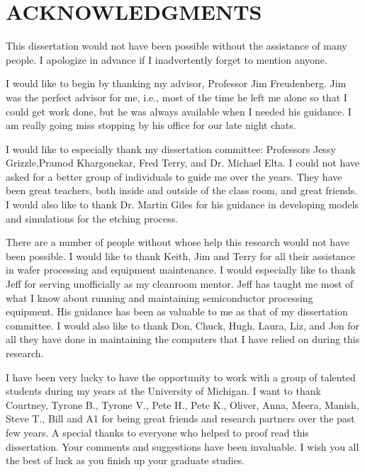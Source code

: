 
\chapter*{ACKNOWLEDGMENTS}


\tab This dissertation would not have been possible without the assistance of many people. I apologize in advance if I inadvertently forget to mention anyone.

I would like to begin by thanking my advisor, Professor Jim Freudenberg. Jim was the perfect advisor for me, i.e., most of the time he left me alone so that I could get work done, but he was always available when I needed his guidance. I am really going miss stopping by his office for our late night chats.

I would like to especially thank my dissertation committee: Professors Jessy Grizzle,Pramod Khargonekar, Fred Terry, and Dr. Michael Elta. I could not have asked for a better group of individuals to guide me over the years. They have been great teachers, both inside and outside of the class room, and great friends. I would also like to thank Dr. Martin Giles for his guidance in developing models and simulations for the etching process.

There are a number of people without whose help this research would not have been possible. I would like to thank Keith, Jim and Terry for all their assistance in wafer processing and equipment maintenance. I would especially like to thank Jeff for serving unofficially as my cleanroom mentor. Jeff has taught me most of what I know about running and maintaining semiconductor processing equipment. His guidance has been as valuable to me as that of my dissertation committee. I would also like to thank Don, Chuck, Hugh, Laura, Liz, and Jon for all they have done in maintaining the computers that I have relied on during this research.

I have been very lucky to have the opportunity to work with a group of talented students during my years at the University of Michigan. I want to thank Courtney, Tyrone B., Tyrone V., Pete H., Pete K., Oliver, Anna, Meera, Manish, Steve T., Bill and A1 for being great friends and research partners over the past few years. A special thanks to everyone who helped to proof read this dissertation. Your comments and suggestions have been invaluable. I wish you all the best of luck as you finish up your graduate studies.

